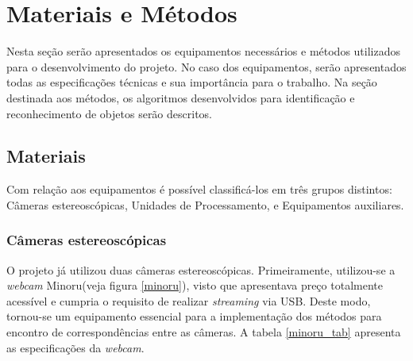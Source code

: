 \chapter{Materiais e Métodos}
\label{Materiais}


Nesta seção serão apresentados os equipamentos necessários e métodos utilizados para o desenvolvimento do projeto. No caso dos equipamentos, serão apresentados todas as especificações técnicas e sua importância para o trabalho. Na seção destinada aos métodos, os algoritmos desenvolvidos para identificação e reconhecimento de objetos serão descritos.


\section{Materiais}

Com relação aos equipamentos é possível classificá-los em três grupos distintos: Câmeras estereoscópicas, Unidades de Processamento, e Equipamentos auxiliares.


\subsection{Câmeras estereoscópicas}

O projeto já utilizou duas câmeras estereoscópicas. Primeiramente, utilizou-se a \textit{webcam} Minoru(veja figura \ref{minoru}), visto que apresentava preço totalmente acessível e cumpria o requisito de realizar \textit{streaming} via USB. Deste modo, tornou-se um equipamento essencial para a implementação dos métodos para encontro de correspondências entre as câmeras. A tabela \ref{minoru_tab}	 apresenta as especificações da \textit{webcam}.


